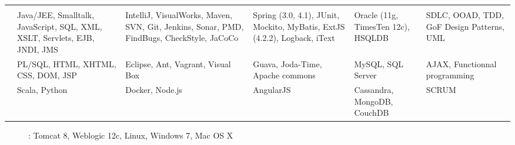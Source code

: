 \section*{
    }
\def\arraystretch{1.2}
\setlength{\tabcolsep}{0.7pt}
\setlength{\textfloatsep}{1cm}
\begin{tabular}{@{}L{0.9in}L{1.5in}L{1.4in}L{1.2in}L{1in}L{1.2in}@{}}
&
\textbf{} &
\textbf{} &
\textbf{} &
\textbf{} &
\textbf{} \\

 &
Java/JEE, Smalltalk, JavaScript, SQL, XML, XSLT, Servlets, EJB, JNDI, JMS &
IntelliJ, VisualWorks, Maven, SVN, Git, Jenkins, Sonar, PMD, FindBugs, CheckStyle, JaCoCo &
Spring (3.0, 4.1), JUnit, Mockito, MyBatis, ExtJS (4.2.2), Logback, iText &
Oracle (11g, TimesTen 12c), HSQLDB &
SDLC, OOAD, TDD, GoF Design Patterns, UML \\

 &
PL/SQL, HTML, XHTML, CSS, DOM, JSP &
Eclipse, Ant, Vagrant, Visual Box &
Guava, Joda-Time, Apache commons &
MySQL, SQL Server &
AJAX, Functionnal programming \\

 &
Scala, Python &
Docker, Node.js &
AngularJS &
Cassandra, MongoDB, CouchDB &
SCRUM
\end{tabular}
\vspace{2pt}
\begin{description}
\item[] : Tomcat 8, Weblogic 12c, Linux, Windows 7, Mac OS X
\end{description}
